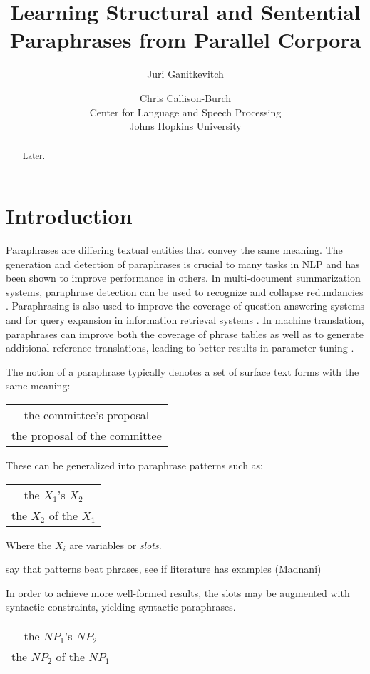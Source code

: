 \documentclass[11pt]{article}
\title{Learning Structural and Sentential Paraphrases from Parallel Corpora}
\author{Juri Ganitkevitch \and Chris Callison-Burch\\ 
Center for Language and Speech Processing\\ 
Johns Hopkins University}
\date{}
\begin{document}
\maketitle

\begin{abstract}
Later.
\end{abstract}

\section{Introduction} \label{introduction}

Paraphrases are differing textual entities that convey the same
meaning. The generation and detection of paraphrases is crucial to
many tasks in NLP and has been shown to improve performance in
others. In multi-document summarization systems, paraphrase detection
can be used to recognize and collapse redundancies
\cite{Barzilay1999}. Paraphrasing is also used to improve the coverage
of question answering systems \cite{Ravichandran2002} and for query
expansion in information retrieval systems \cite{Anick1999}. In
machine translation, paraphrases can improve both the coverage of
phrase tables \cite{Callison-Burch2006b} as well as to generate
additional reference translations, leading to better results in
parameter tuning \cite{Madnani2007}. 

The notion of a paraphrase typically denotes a set of surface text
forms with the same meaning:
\begin{center}
\begin{tabular}{c}
the committee's proposal \\
the proposal of the committee
\end{tabular}
\end{center}
These can be generalized into paraphrase patterns such as:
\begin{center}
\begin{tabular}{c}
the $X_1$'s $X_2$ \\
the $X_2$ of the $X_1$
\end{tabular}
\end{center}
Where the $X_i$ are variables or \emph{slots}. 

say that patterns beat phrases, see if literature has examples (Madnani)

In order to achieve more well-formed results, the slots may be
augmented with syntactic constraints, yielding syntactic paraphrases.
\begin{center}
\begin{tabular}{c}
the $NP_1$'s $NP_2$ \\
the $NP_2$ of the $NP_1$
\end{tabular}
\end{center}
\end{document}
